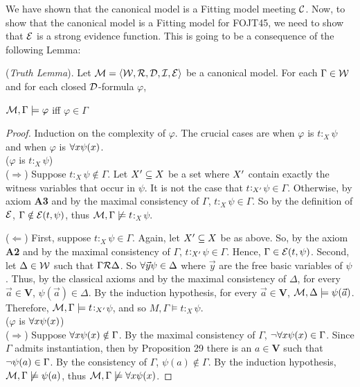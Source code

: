 \qquad We have shown that the canonical model is a Fitting model meeting $\mathcal{C}$. Now, to show that the canonical model is a Fitting model for FOJT45, we need to show that $\mathcal{E}$ is a strong evidence function. This is going to be a consequence of the following Lemma:


\begin{lema}
	(\textit{Truth Lemma}). Let $\mathcal{M}=\langle\mathcal{W},\mathcal{R},\mathcal{D},\mathcal{I},\mathcal{E} \rangle$ be a canonical model. For each $\Gamma \in \mathcal{W}$ and for each closed $\mathcal{D}$-formula $\varphi$,
	\begin{center}
		$\mathcal{M},\Gamma \models \varphi$ iff $\varphi \in \Gamma$
	\end{center}
\end{lema}

\begin{proof}
	Induction on the complexity of $\varphi$. The crucial cases are when $\varphi$ is $t$$:_{X}$$\psi$ and when $\varphi$ is $\forall x \psi(x)$. \\
	
	($\varphi$ is $t$$:_{X}$$\psi$)\\
	
	\qquad ($\Rightarrow$) Suppose $t$$:_{X}$$\psi \notin \Gamma$. Let $X^{\prime} \subseteq X$ be a set where $X^{\prime}$ contain exactly the witness variables that occur in $\psi$. It is not the case that $t$$:_{X^{\prime}}$$\psi \in \Gamma$. Otherwise, by axiom \textbf{A3} and by the maximal consistency of $\Gamma$,  $t$$:_{X}$$\psi \in \Gamma$. So by the definition of $\mathcal{E}$, $\Gamma \notin \mathcal{E}(t,\psi)$, thus $\mathcal{M},\Gamma \not\models t$$:_{X}$$\psi$.
	
	\qquad ($\Leftarrow$) First, suppose $t$$:_{X}$$\psi \in \Gamma$. Again, let $X^{\prime} \subseteq X$ be as above. So, by the axiom \textbf{A2} and by the maximal consistency of $\Gamma$, $t$$:_{X^{\prime}}$$\psi \in \Gamma$. Hence, $\Gamma \in \mathcal{E}(t,\psi)$. Second, let $\Delta \in \mathcal{W}$ such that $\Gamma \mathcal{R} \Delta$. So $\forall \vec{y}\psi \in \Delta$ where $\vec{y}$ are the free basic variables of $\psi$. Thus, by the classical axioms and by the maximal consistency of $\Delta$, for every $\vec{a} \in \textbf{V}$,  $\psi(\vec{a}) \in \Delta$. By the induction hypothesis, for every $\vec{a} \in \textbf{V}$, $\mathcal{M}, \Delta \models \psi(\vec{a})$. Therefore, $\mathcal{M},\Gamma \models t$$:_{X^{\prime}}$$\psi$, and so $M,\Gamma \models t$$:_{X}$$\psi$.\\
	
	
	($\varphi$ is $\forall x \psi(x)$)\\
	
	\qquad ($\Rightarrow$) Suppose $\forall x \psi(x) \notin \Gamma$. By the maximal consistency of $\Gamma$, $\neg \forall x \psi(x) \in \Gamma$. Since $\Gamma$ admits instantiation, then by Proposition 29 there is an $a \in \textbf{V}$ such that $\neg \psi(a) \in \Gamma$. By the consistency of $\Gamma$, $\psi(a) \notin \Gamma$. By the induction hypothesis, $\mathcal{M}, \Gamma \not\models \psi(a)$, thus $\mathcal{M}, \Gamma \not\models \forall x \psi(x)$.    
	

\end{proof}
